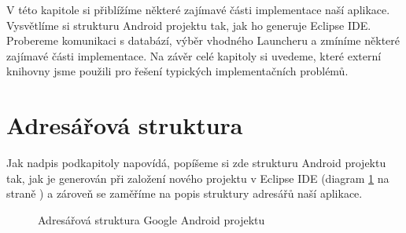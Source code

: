 \documentclass[thesis=M,czech]{FITthesis}[2012/06/26]
\begin{document}
V této kapitole si přiblížíme některé zajímavé části implementace naší aplikace. Vysvětlíme si strukturu Android projektu tak, jak ho generuje Eclipse IDE. Probereme komunikaci s databází, výběr vhodného Launcheru a zmíníme některé zajímavé části implementace. Na závěr celé kapitoly si uvedeme, které externí knihovny jsme použili pro řešení typických implementačních problémů.

\section{Adresářová struktura}
Jak nadpis podkapitoly napovídá, popíšeme si zde strukturu Android projektu \cite{android_project_structure} tak, jak je generován při založení nového projektu v Eclipse IDE (diagram \ref{fig:android_project_structure} na straně \pageref{fig:android_project_structure}) a zároveň se zaměříme na popis struktury adresářů naší aplikace.

\begin{figure}
\caption{Adresářová struktura Google Android projektu}
\label{fig:android_project_structure}
\end{figure}
\end{document}
